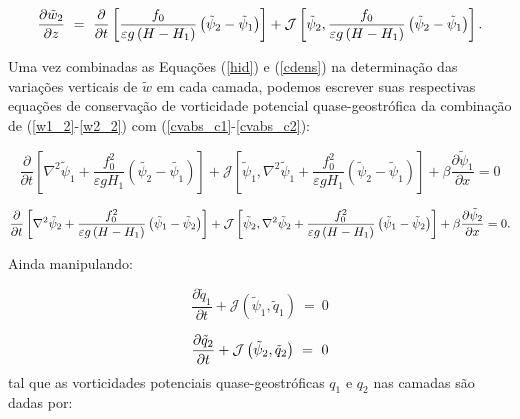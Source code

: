 \begin{equation}
\frac{\partial \tilde{w}_2}{\partial z} \ = \ \frac{\partial}{\partial t} \left [ \frac{f_0}{\varepsilon g \left ( H - H_1 \right ) } \left ( \tilde{\psi}_2 - \tilde{\psi}_1 \right ) \right ] + \mathcal{J} \left [ \tilde{\psi}_2, \frac{f_0}{\varepsilon g \left ( H - H_1 \right ) } \left ( \tilde{\psi}_2 - \tilde{\psi}_1 \right ) \right ].
\label{w2_2}
\vspace{0.5cm}
\end{equation}

Uma vez combinadas as Equações (\ref{hid}) e (\ref{cdens}) na determinação das variações 
verticais de $\tilde{w}$ em cada camada, podemos escrever suas respectivas equações de conservação de 
vorticidade potencial quase-geostrófica da combinação de (\ref{w1_2}-\ref{w2_2}) com 
(\ref{cvabs_c1}-\ref{cvabs_c2}):

\begin{equation}
\frac{\partial}{\partial t} \left [ \nabla^2 \tilde{\psi}_1 + \frac{f_0^2}{\varepsilon g H_1} \left ( \tilde{\psi_2} - \tilde{\psi_1} \right ) \right ] + \mathcal{J} \left [ \tilde{\psi}_1,\nabla^2 \tilde{\psi}_1 + \frac{f_0^2}{\varepsilon g H_1} \left ( \tilde{\psi}_2 - \tilde{\psi}_1 \right ) \right ] + \beta \frac{\partial \tilde{\psi}_1}{\partial x} = 0 \nonumber
\end{equation}

\begin{equation}
\frac{\partial}{\partial t} \left [ \nabla^2 \tilde{\psi}_2 + \frac{f_0^2}{\varepsilon g \left ( H - H_1 \right ) } \left ( \tilde{\psi}_1 - \tilde{\psi}_2 \right ) \right ] + \mathcal{J} \left [ \tilde{\psi}_2,\nabla^2 \tilde{\psi}_2 + \frac{f_0^2}{\varepsilon g \left ( H - H_1 \right ) } \left ( \tilde{\psi}_1 - \tilde{\psi}_2 \right ) \right ] + \beta \frac{\partial \tilde{\psi}_2}{\partial x} = 0. \nonumber
\vspace{0.5cm}
\end{equation}

Ainda manipulando:

\begin{equation}
\frac{\partial \tilde{q}_1}{\partial t} + \mathcal{J} \left ( \tilde{\psi}_1, \tilde{q}_1 \right ) \ = \ 0
\label{cvpot_c1}
\end{equation}

\begin{equation}
\frac{\partial \tilde{q}_2}{\partial t} + \mathcal{J} \left ( \tilde{\psi}_2, \tilde{q}_2 \right ) \ = \ 0
\label{cvpot_c2}
\vspace{0.5cm}
\end{equation}
tal que as vorticidades potenciais quase-geostróficas $q_1$ e $q_2$ nas camadas são dadas por:

